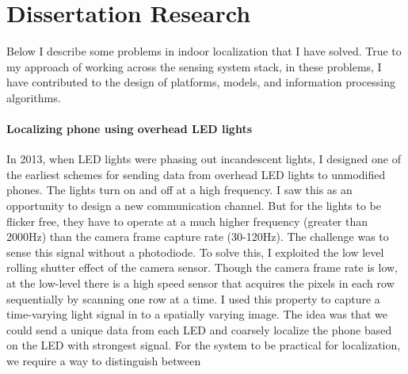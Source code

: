 \documentclass[10pt]{article}
\begin{document}





\section{Dissertation Research}
Below I describe some problems in indoor localization that I have solved. True to my approach of working across the sensing system stack, in these problems, I have contributed to the design of platforms, models, and information processing algorithms.\\

\paragraph{Localizing phone using overhead LED lights}
In 2013, when LED lights were phasing out incandescent lights, I designed one of the earliest schemes for sending data from overhead LED lights to unmodified phones. The lights turn on and off at a high frequency. I saw this as an opportunity to design a new communication channel. But for the lights to be flicker free, they have to operate at a much higher frequency (greater than 2000Hz) than the camera frame capture rate (30-120Hz). The challenge was to sense this signal without a photodiode. To solve this, I exploited the low level rolling shutter effect of the camera sensor. Though the camera frame rate is low, at the low-level there is a high speed sensor that acquires the pixels in each row sequentially by scanning one row at a time. I used this property to capture a time-varying light signal in to a spatially varying image. 
The idea was that we could send a unique data from each LED and coarsely localize the phone based on the LED with strongest signal. For the system to be practical for localization, we require a way to distinguish between 
\end{document}
